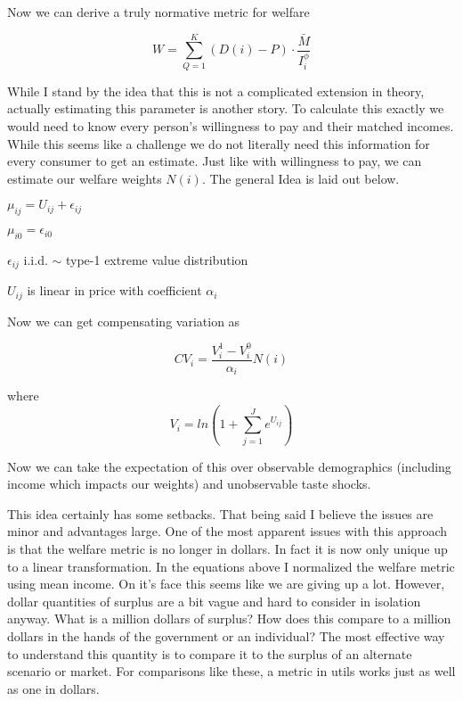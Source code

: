 \documentclass[11pt]{article}
\begin{document}
Now we can derive a truly normative metric for welfare

$$  W = \sum_{Q = 1}^{K} (D(i) - P) \cdot \frac{\bar{M}}{I_i^\phi}  $$

While I stand by the idea that this is not a complicated extension in theory, actually estimating this parameter is another story. To calculate this exactly we would need to know every person's willingness to pay and their matched incomes. While this seems like a challenge we do not literally need this information for every consumer to get an estimate. Just like with willingness to pay, we can estimate our welfare weights $N(i)$. The general Idea is laid out below. 

$\mu_{ij} = U_{ij} + \epsilon_{ij}$

 $\mu_{i0} = \epsilon_{i0}$
 
 $\epsilon_{ij}$ i.i.d. $\sim$ type-1 extreme value distribution 
 
 $U_{ij}$ is linear in price with coefficient $\alpha_i$
 

Now we can get compensating variation as 

$$ CV_i = \frac{V_i^1 - V_i^0}{\alpha_i} N(i) $$ 

where 
$$ V_i = ln(1 + \sum_{j = 1}^{J} e^{U_{ij}})$$ 

Now we can take the expectation of this over observable demographics (including income which impacts our weights) and unobservable taste shocks. 


This idea certainly has some setbacks. That being said I believe the issues are minor and advantages large. One of the most apparent issues with this approach is that the welfare metric is no longer in dollars. In fact it is now only unique up to a linear transformation. In the equations above I normalized the welfare metric using mean income. On it's face this seems like we are giving up a lot. However, dollar quantities of surplus are a bit vague and hard to consider in isolation anyway. What is a million dollars of surplus? How does this compare to a million dollars in the hands of the government or an individual? The most effective way to understand this quantity is to compare it to the surplus of an alternate scenario or market. For comparisons like these, a metric in utils works just as well as one in dollars. 
\end{document}
